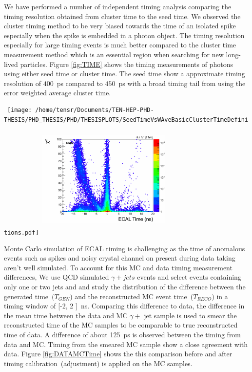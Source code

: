 We have performed a number of independent timing analysis comparing the timing resolution obtained from cluster time to the seed time. We observed the cluster timing method to be very biased towards the time of an isolated spike especially when the spike is embedded in a photon object. The timing resolution especially for large timing events is much better compared to the cluster time measurement method which is an essential region when searching for new long-lived particles.
Figure \ref{fig:TIME} shows the timing measurements of photons using either seed time or cluster time. The seed time show a approximate timing resolution of $400$~ps compared to $450$~ps with a broad timing tail from using the error weighted average cluster time.

\begin{center}
\centering
\mbox{
\texttt{[image: /home/tensr/Documents/TEN-HEP-PHD-THESIS/PHD\_THESIS/PHD/THESISPLOTS/SeedTimeVsWAveBasicClusterTimeDefinitions.pdf]}
\includegraphics[height=6cm, width=0.5\textwidth]{THESISPLOTS/seedTime_Chi2.png}
}
\label{fig:TIME}
\end{center}

Monte Carlo simulation of ECAL timing is challenging  as the time of anomalous events such as spikes and noisy crystal channel on present during data taking 
aren't well simulated.  To account for this MC and data timing measurement differences, 
We use QCD simulated $\gamma + jets$ events and select events containing only one or two jets and and study the distribution of the difference between the generated time~$(T_{GEN}$) and the reconstructed MC event time~($T_{RECO}$) in a timing window of [-2, 2 ]~ns. Comparing this difference to data, the difference in the mean time between the data and MC $\gamma +$ jet sample is used to smear the reconstructed time of the MC samples to be comparable to true reconstructed time of data. A difference of about 125~ps is observed between the timing from data and MC.  Timing from the smeared MC sample show a close agreement with data.
Figure \ref{fig:DATAMCTime} shows the this comparison before and after timing calibration~(adjustment) is applied on the MC samples.

